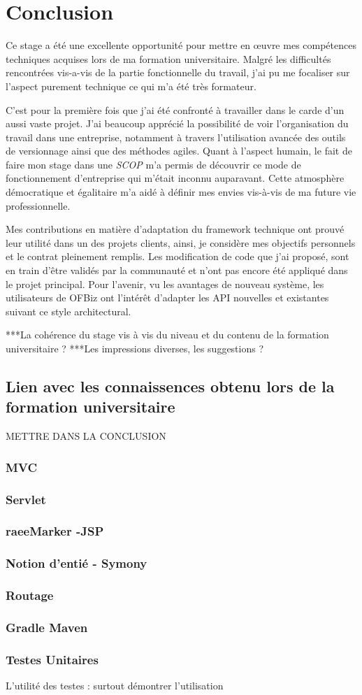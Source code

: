 \chapter{Conclusion}
Ce stage a été une excellente opportunité pour mettre en œuvre mes compétences techniques acquises lors de ma formation universitaire. Malgré les difficultés rencontrées vis-a-vis de la partie fonctionnelle du travail, j'ai pu me focaliser sur l'aspect purement technique ce qui m'a été très formateur. 

C'est pour la première fois que j'ai été confronté à travailler dans le carde d'un aussi vaste projet. J'ai beaucoup apprécié la possibilité de voir l'organisation du travail dans une entreprise, notamment à travers l'utilisation avancée des outils de versionnage ainsi que des méthodes agiles. Quant à l'aspect humain, le fait de faire mon stage dans une \emph{SCOP} m'a permis de découvrir ce mode de fonctionnement d'entreprise qui m'était inconnu auparavant. Cette atmosphère démocratique et égalitaire m'a aidé à définir mes envies vis-à-vis de ma future vie professionnelle.

Mes contributions en matière d'adaptation du framework technique ont prouvé leur utilité dans un des projets clients, ainsi, je considère mes objectifs personnels et le contrat pleinement remplis. Les modification de code que j'ai proposé, sont en train d'être validés par la communauté et n'ont pas encore été appliqué dans le projet principal.
Pour l'avenir, vu les avantages de nouveau système, les utilisateurs de OFBiz ont l'intérêt d'adapter les API nouvelles et existantes suivant ce style architectural.

***La cohérence du stage vis à vis du niveau et du contenu de la formation
universitaire ?
***Les impressions diverses, les suggestions ?


\section{Lien avec les connaissences obtenu lors de la formation universitaire}
METTRE DANS LA CONCLUSION
\subsection{MVC}
\subsection{Servlet}
\subsection{raeeMarker -JSP}
\subsection{Notion d'entié - Symony}
\subsection{Routage}
\subsection{Gradle Maven}
\subsection{Testes Unitaires}
L'utilité des testes : surtout démontrer l'utilisation 
